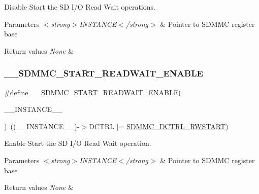 Disable Start the SD I/O Read Wait operations. 


\begin{DoxyParams}{Parameters}
{\em $<$strong$>$\+I\+N\+S\+T\+A\+N\+C\+E$<$/strong$>$} & Pointer to S\+D\+M\+MC register base\\
\hline
\end{DoxyParams}

\begin{DoxyRetVals}{Return values}
{\em None} & \\
\hline
\end{DoxyRetVals}
\mbox{\label{group___s_d_m_m_c___l_l___interrupt___clock_ga6fc4b7016cb0e6474a0aeb04d658d30a}} 
\subsubsection{\texorpdfstring{\_\_SDMMC\_START\_READWAIT\_ENABLE}{\_\_SDMMC\_START\_READWAIT\_ENABLE}}
{\footnotesize\ttfamily \#define \+\_\+\+\_\+\+S\+D\+M\+M\+C\+\_\+\+S\+T\+A\+R\+T\+\_\+\+R\+E\+A\+D\+W\+A\+I\+T\+\_\+\+E\+N\+A\+B\+LE(\begin{DoxyParamCaption}\item[{}]{\+\_\+\+\_\+\+I\+N\+S\+T\+A\+N\+C\+E\+\_\+\+\_\+ }\end{DoxyParamCaption})~((\+\_\+\+\_\+\+I\+N\+S\+T\+A\+N\+C\+E\+\_\+\+\_\+)-\/$>$D\+C\+T\+RL $\vert$= \mbox{\hyperlink{group___peripheral___registers___bits___definition_ga4302f186ec1e43bc38a4357db38fc0fa}{S\+D\+M\+M\+C\+\_\+\+D\+C\+T\+R\+L\+\_\+\+R\+W\+S\+T\+A\+RT}})}



Enable Start the SD I/O Read Wait operation. 


\begin{DoxyParams}{Parameters}
{\em $<$strong$>$\+I\+N\+S\+T\+A\+N\+C\+E$<$/strong$>$} & Pointer to S\+D\+M\+MC register base\\
\hline
\end{DoxyParams}

\begin{DoxyRetVals}{Return values}
{\em None} & \\
\hline
\end{DoxyRetVals}
\mbox{\label{group___s_d_m_m_c___l_l___interrupt___clock_ga0f1ff381bd70d14433ae582539005904}} 
